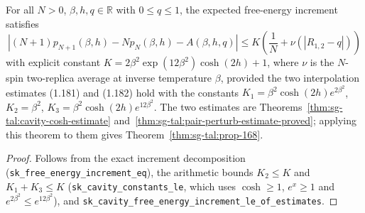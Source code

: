 \begin{theorem}
\label{thm:sg-tal:cavity-free-energy-increment-bound}
  \leanok
{}
For all $N > 0$, $\beta, h, q \in \mathbb R$ with $0 \le q \le 1$, the expected free-energy increment satisfies
\[
  |(N+1) p_{N+1}(\beta, h) - N p_N(\beta, h) - A(\beta, h, q)| \le K \left(\frac{1}{N} + \nu(|R_{1,2} - q|)\right)
\]
with explicit constant $K = 2 \beta^2 \exp(12\beta^2) \cosh(2h) + 1$, where $\nu$ is the $N$-spin two-replica
average at inverse temperature $\beta$, provided the two interpolation estimates (1.181) and (1.182) hold
with the constants $K_1=\beta^2\cosh(2h)e^{2\beta^2}$, $K_2=\beta^2$, $K_3=\beta^2\cosh(2h)e^{12\beta^2}$.  The two
estimates are Theorems~\ref{thm:sg-tal:cavity-cosh-estimate} and~\ref{thm:sg-tal:pair-perturb-estimate-proved};
applying this theorem to them gives Theorem~\ref{thm:sg-tal:prop-168}.
\end{theorem}
\begin{proof}
  \leanok
Follows from the exact increment decomposition (\texttt{sk\_free\_energy\_increment\_eq}), the arithmetic bounds
$K_2 \le K$ and $K_1 + K_3 \le K$ (\texttt{sk\_cavity\_constants\_le}, which uses $\cosh\ge1$, $e^{x}\ge1$ and
$e^{2\beta^2}\le e^{12\beta^2}$), and \texttt{sk\_cavity\_free\_energy\_increment\_le\_of\_estimates}.
\end{proof}

